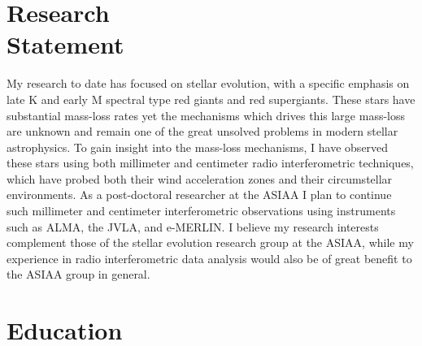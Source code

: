 \documentclass[margin,line]{resume}
\begin{document}
\begin{resume}
    \section{\mysidestyle Research\\Statement} 
My research to date has focused on stellar evolution, with a specific emphasis on late K and early M spectral type red giants and red supergiants. These stars have substantial mass-loss rates yet the mechanisms which drives this large mass-loss are unknown and remain one of the great unsolved problems in modern stellar astrophysics. To gain insight into the mass-loss mechanisms, I have observed these stars using both millimeter and centimeter radio interferometric techniques, which have probed both their wind acceleration zones and their circumstellar environments. As a post-doctoral researcher at the ASIAA I plan to continue such millimeter and centimeter interferometric observations using instruments such as ALMA, the JVLA, and e-MERLIN. I believe my research interests complement those of the stellar evolution research group at the ASIAA, while my experience in radio interferometric data analysis would also be of great benefit to the ASIAA group in general.


    \vspace{2mm}
    \section{\mysidestyle Education}


\end{resume}
\end{document}
